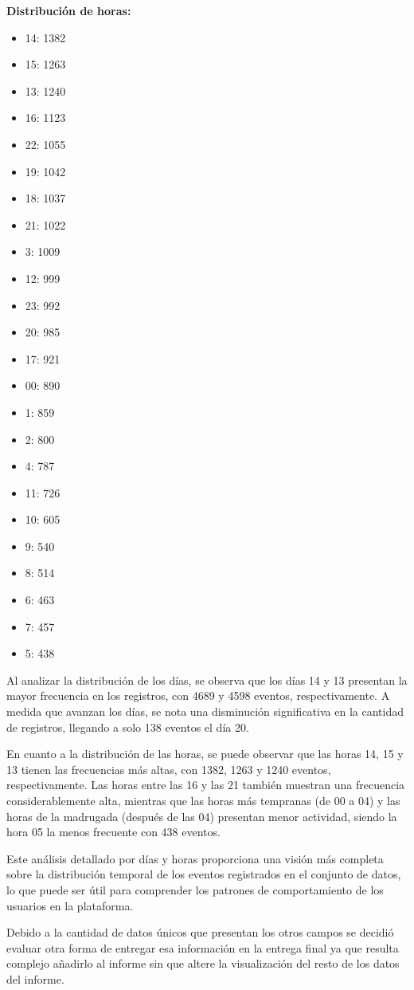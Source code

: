 \textbf{Distribución de horas:}
\begin{itemize}
    \item 14: 1382
    \item 15: 1263
    \item 13: 1240
    \item 16: 1123
    \item 22: 1055
    \item 19: 1042
    \item 18: 1037
    \item 21: 1022
    \item 3: 1009
    \item 12: 999
    \item 23: 992
    \item 20: 985
    \item 17: 921
    \item 00: 890
    \item 1: 859
    \item 2: 800
    \item 4: 787
    \item 11: 726
    \item 10: 605
    \item 9: 540
    \item 8: 514
    \item 6: 463
    \item 7: 457
    \item 5: 438
\end{itemize}

Al analizar la distribución de los días, se observa que los días 14 y 13 presentan la mayor frecuencia en los registros, con 4689 y 4598 eventos, respectivamente. A medida que avanzan los días, se nota una disminución significativa en la cantidad de registros, llegando a solo 138 eventos el día 20.

En cuanto a la distribución de las horas, se puede observar que las horas 14, 15 y 13 tienen las frecuencias más altas, con 1382, 1263 y 1240 eventos, respectivamente. Las horas entre las 16 y las 21 también muestran una frecuencia considerablemente alta, mientras que las horas más tempranas (de 00 a 04) y las horas de la madrugada (después de las 04) presentan menor actividad, siendo la hora 05 la menos frecuente con 438 eventos.

Este análisis detallado por días y horas proporciona una visión más completa sobre la distribución temporal de los eventos registrados en el conjunto de datos, lo que puede ser útil para comprender los patrones de comportamiento de los usuarios en la plataforma.

Debido a la cantidad de datos únicos que presentan los otros campos se decidió evaluar otra forma de entregar esa información en la entrega final ya que resulta complejo añadirlo al informe sin que altere la visualización del resto de los datos del informe.